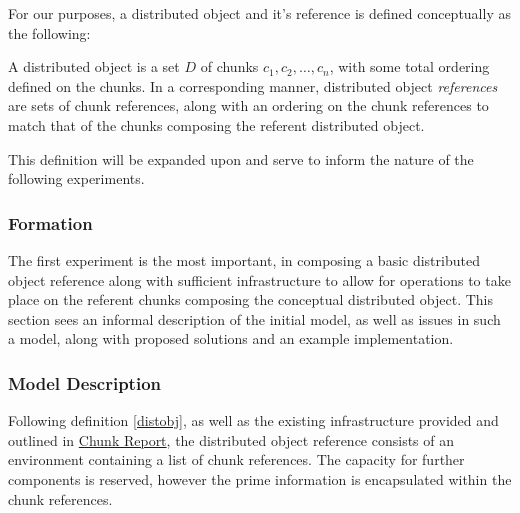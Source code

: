 For our purposes, a distributed object and it's reference is defined
conceptually as the following:

\begin{definition}
	\label{distobj}
	A distributed object is a set \(D\) of chunks \(c_1, c_2, \dots, c_n\),
	with some total ordering defined on the chunks. 
	In a corresponding manner, distributed object \textit{references} are
	sets of chunk references, along with an ordering on the chunk
	references to match that of the chunks composing the referent
	distributed object.
\end{definition}

This definition will be expanded upon and serve to inform the nature of the
following experiments.

\subsubsection{Formation}

The first experiment is the most important, in composing a basic distributed
object reference along with sufficient infrastructure to allow for operations
to take place on the referent chunks composing the conceptual distributed
object.
This section sees an informal description of the initial model, as well as
issues in such a model, along with proposed solutions and an example
implementation.

\subsubsection{Model Description}

Following definition \ref{distobj}, as well as the existing infrastructure
provided and outlined in \href{chunk-report.pdf}{Chunk Report}, the distributed
object reference consists of an environment containing a list of chunk
references.
The capacity for further components is reserved, however the prime information
is encapsulated within the chunk references.

